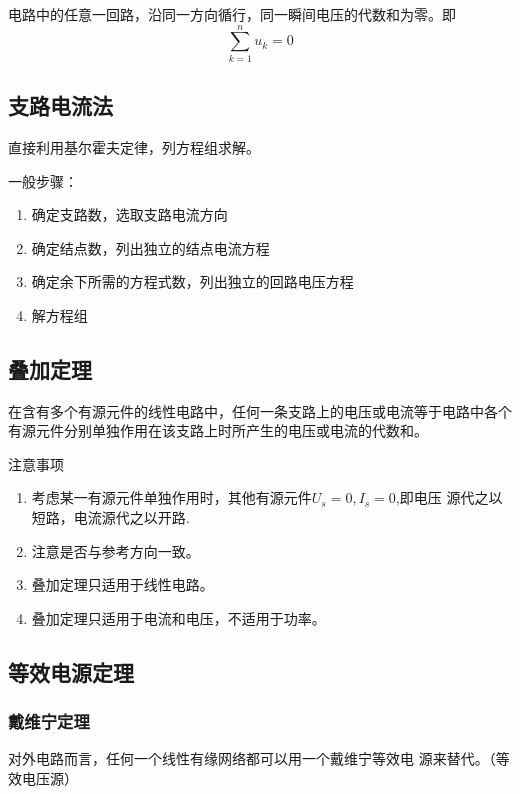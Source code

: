 电路中的任意一回路，沿同一方向循行，同一瞬间电压的代数和为零。即
\[
    \sum_{k=1}^n u_k=0
\]


\subsection{支路电流法}

直接利用基尔霍夫定律，列方程组求解。

\noindent 一般步骤：
\begin{enumerate}
    \item 确定支路数，选取支路电流方向
    \item 确定结点数，列出独立的结点电流方程
    \item 确定余下所需的方程式数，列出独立的回路电压方程
    \item 解方程组
\end{enumerate}

\subsection{叠加定理}

在含有多个有源元件的线性电路中，任何一条支路上的电压或电流等于电路中各个
有源元件分别单独作用在该支路上时所产生的电压或电流的代数和。

\large{注意事项}

\normalsize
\begin{enumerate}
    \item 考虑某一有源元件单独作用时，其他有源元件$U_s=0,I_s=0$,即电压
    源代之以短路，电流源代之以开路.
    \item 注意是否与参考方向一致。
    \item 叠加定理只适用于线性电路。
    \item 叠加定理只适用于电流和电压，不适用于功率。
\end{enumerate}

\subsection{等效电源定理}

\subsubsection{戴维宁定理}

对外电路而言，任何一个线性有缘网络都可以用一个戴维宁等效电
源来替代。（等效电压源）

